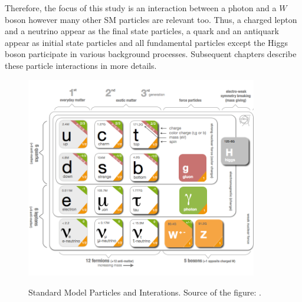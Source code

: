 
Therefore, the focus of this study is an interaction between a photon and a $W$ boson however many other SM particles are relevant too. Thus, a charged lepton and a neutrino appear as the final state particles, a quark and an antiquark appear as initial state particles and all fundamental particles except the Higgs boson participate in various background processes. Subsequent chapters describe these particle interactions in more details.\\


\begin{figure}[htb]
  \begin{center}
    {\includegraphics[width=0.90\textwidth]{../figs/Intro/StandardModel.png}}
    \caption{Standard Model Particles and Interations. Source of the figure: \cite{ref_fig_SM}.}
    \label{fig:SMtable}
  \end{center}
\end{figure}





